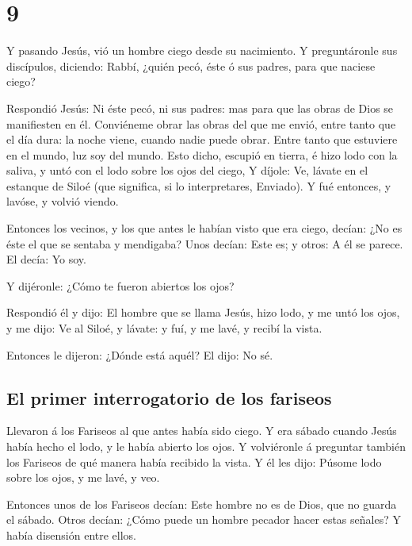 \hypertarget{section-8}{%
\section{9}\label{section-8}}

 Y pasando Jesús, vió un hombre ciego desde su nacimiento.
 Y preguntáronle sus discípulos, diciendo: Rabbí, ¿quién
pecó, éste ó sus padres, para que naciese ciego?

 Respondió Jesús: Ni éste pecó, ni sus padres: mas para
que las obras de Dios se manifiesten en él.  Conviéneme
obrar las obras del que me envió, entre tanto que el día dura: la noche
viene, cuando nadie puede obrar.  Entre tanto que
estuviere en el mundo, luz soy del mundo.  Esto dicho,
escupió en tierra, é hizo lodo con la saliva, y untó con el lodo sobre
los ojos del ciego,  Y díjole: Ve, lávate en el estanque
de Siloé (que significa, si lo interpretares, Enviado). Y fué entonces,
y lavóse, y volvió viendo.

 Entonces los vecinos, y los que antes le habían visto que
era ciego, decían: ¿No es éste el que se sentaba y mendigaba?
 Unos decían: Este es; y otros: A él se parece. El decía:
Yo soy.

 Y dijéronle: ¿Cómo te fueron abiertos los ojos?

 Respondió él y dijo: El hombre que se llama Jesús, hizo
lodo, y me untó los ojos, y me dijo: Ve al Siloé, y lávate: y fuí, y me
lavé, y recibí la vista.

 Entonces le dijeron: ¿Dónde está aquél? El dijo: No sé.

\hypertarget{el-primer-interrogatorio-de-los-fariseos}{%
\subsection{El primer interrogatorio de los
fariseos}\label{el-primer-interrogatorio-de-los-fariseos}}

 Llevaron á los Fariseos al que antes había sido ciego.
 Y era sábado cuando Jesús había hecho el lodo, y le
había abierto los ojos.  Y volviéronle á preguntar
también los Fariseos de qué manera había recibido la vista. Y él les
dijo: Púsome lodo sobre los ojos, y me lavé, y veo.

 Entonces unos de los Fariseos decían: Este hombre no es
de Dios, que no guarda el sábado. Otros decían: ¿Cómo puede un hombre
pecador hacer estas señales? Y había disensión entre ellos.

